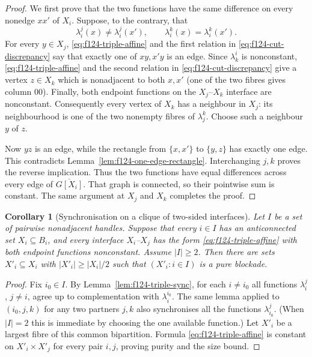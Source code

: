 \documentclass[11pt]{article}
\numberwithin{equation}{section}
\theoremstyle{plain}
\newtheorem{corollary}[theorem]{Corollary}
\theoremstyle{definition}
\begin{document}
\begin{proof}
We first prove that the two functions have the same difference on every
nonedge $xx'$ of $X_i$.  Suppose, to the contrary, that
\begin{equation}
 \lambda_i^j(x)\ne\lambda_i^j(x'),
 \qquad
 \lambda_i^k(x)=\lambda_i^k(x').
 \label{eq:f124-cut-discrepancy}
\end{equation}
For every $y\in X_j$, \eqref{eq:f124-triple-affine} and the first
relation in \eqref{eq:f124-cut-discrepancy} say that exactly one of
$xy,x'y$ is an edge.  Since $\lambda_k^i$ is nonconstant,
\eqref{eq:f124-triple-affine} and the second relation in
\eqref{eq:f124-cut-discrepancy} give a vertex $z\in X_k$ which is nonadjacent to both
$x,x'$ (one of the two fibres gives column $00$).  Finally, both endpoint
functions on the $X_j$--$X_k$ interface are nonconstant.  Consequently
every vertex of $X_k$ has a neighbour in $X_j$: its neighbourhood is one of
the two nonempty fibres of $\lambda_j^k$.  Choose such a neighbour $y$ of
$z$.

Now $yz$ is an edge, while the rectangle from $\{x,x'\}$ to $\{y,z\}$
has exactly one edge.  This contradicts
Lemma~\ref{lem:f124-one-edge-rectangle}.
Interchanging $j,k$ proves the reverse implication.  Thus the two
functions have equal differences across every edge of
$\overline{G[X_i]}$.  That graph is connected, so their pointwise sum is
constant.  The same argument at $X_j$ and $X_k$ completes the proof.
\end{proof}

\begin{corollary}[Synchronisation on a clique of two-sided interfaces]
\label{cor:f124-full-cut-extraction}
Let $I$ be a set of pairwise nonadjacent handles.  Suppose that every
$i\in I$ has an anticonnected set $X_i\subseteq B_i$, and
every interface $X_i$--$X_j$ has the form
\eqref{eq:f124-triple-affine} with both endpoint functions
nonconstant.  Assume $|I|\geq2$.  Then there are sets $X'_i\subseteq X_i$ with
$|X'_i|\geq |X_i|/2$ such that $(X'_i:i\in I)$ is a pure blockade.
\end{corollary}

\begin{proof}
Fix $i_0\in I$.  By Lemma~\ref{lem:f124-triple-sync}, for each $i\ne i_0$
all functions $\lambda_i^j$, $j\ne i$, agree up to complementation with
$\lambda_i^{i_0}$.  The same lemma applied to $(i_0,j,k)$ for any two
partners $j,k$ also synchronises all the functions $\lambda_{i_0}^j$.
(When $|I|=2$ this is immediate by choosing the one available function.)
Let $X'_i$ be a largest fibre of this common
bipartition.  Formula \eqref{eq:f124-triple-affine} is constant on
$X'_i\times X'_j$ for every
pair $i,j$, proving purity and the size bound.
\end{proof}
\end{document}

